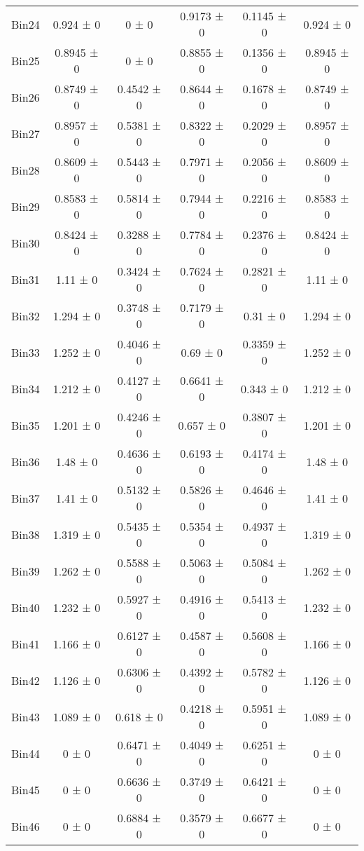 \begin{tabular}{@{\extracolsep{4pt}}lccccc@{}}
     Bin24 & 0.924 ± 0 & 0 ± 0 & 0.9173 ± 0 & 0.1145 ± 0 & 0.924 ± 0 \\ 
     Bin25 & 0.8945 ± 0 & 0 ± 0 & 0.8855 ± 0 & 0.1356 ± 0 & 0.8945 ± 0 \\ 
     Bin26 & 0.8749 ± 0 & 0.4542 ± 0 & 0.8644 ± 0 & 0.1678 ± 0 & 0.8749 ± 0 \\ 
     Bin27 & 0.8957 ± 0 & 0.5381 ± 0 & 0.8322 ± 0 & 0.2029 ± 0 & 0.8957 ± 0 \\ 
     Bin28 & 0.8609 ± 0 & 0.5443 ± 0 & 0.7971 ± 0 & 0.2056 ± 0 & 0.8609 ± 0 \\ 
     Bin29 & 0.8583 ± 0 & 0.5814 ± 0 & 0.7944 ± 0 & 0.2216 ± 0 & 0.8583 ± 0 \\ 
     Bin30 & 0.8424 ± 0 & 0.3288 ± 0 & 0.7784 ± 0 & 0.2376 ± 0 & 0.8424 ± 0 \\ 
     Bin31 & 1.11 ± 0 & 0.3424 ± 0 & 0.7624 ± 0 & 0.2821 ± 0 & 1.11 ± 0 \\ 
     Bin32 & 1.294 ± 0 & 0.3748 ± 0 & 0.7179 ± 0 & 0.31 ± 0 & 1.294 ± 0 \\ 
     Bin33 & 1.252 ± 0 & 0.4046 ± 0 & 0.69 ± 0 & 0.3359 ± 0 & 1.252 ± 0 \\ 
     Bin34 & 1.212 ± 0 & 0.4127 ± 0 & 0.6641 ± 0 & 0.343 ± 0 & 1.212 ± 0 \\ 
     Bin35 & 1.201 ± 0 & 0.4246 ± 0 & 0.657 ± 0 & 0.3807 ± 0 & 1.201 ± 0 \\ 
     Bin36 & 1.48 ± 0 & 0.4636 ± 0 & 0.6193 ± 0 & 0.4174 ± 0 & 1.48 ± 0 \\ 
     Bin37 & 1.41 ± 0 & 0.5132 ± 0 & 0.5826 ± 0 & 0.4646 ± 0 & 1.41 ± 0 \\ 
     Bin38 & 1.319 ± 0 & 0.5435 ± 0 & 0.5354 ± 0 & 0.4937 ± 0 & 1.319 ± 0 \\ 
     Bin39 & 1.262 ± 0 & 0.5588 ± 0 & 0.5063 ± 0 & 0.5084 ± 0 & 1.262 ± 0 \\ 
     Bin40 & 1.232 ± 0 & 0.5927 ± 0 & 0.4916 ± 0 & 0.5413 ± 0 & 1.232 ± 0 \\ 
     Bin41 & 1.166 ± 0 & 0.6127 ± 0 & 0.4587 ± 0 & 0.5608 ± 0 & 1.166 ± 0 \\ 
     Bin42 & 1.126 ± 0 & 0.6306 ± 0 & 0.4392 ± 0 & 0.5782 ± 0 & 1.126 ± 0 \\ 
     Bin43 & 1.089 ± 0 & 0.618 ± 0 & 0.4218 ± 0 & 0.5951 ± 0 & 1.089 ± 0 \\ 
     Bin44 & 0 ± 0 & 0.6471 ± 0 & 0.4049 ± 0 & 0.6251 ± 0 & 0 ± 0 \\ 
     Bin45 & 0 ± 0 & 0.6636 ± 0 & 0.3749 ± 0 & 0.6421 ± 0 & 0 ± 0 \\ 
     Bin46 & 0 ± 0 & 0.6884 ± 0 & 0.3579 ± 0 & 0.6677 ± 0 & 0 ± 0 \\ 

\end{tabular}
